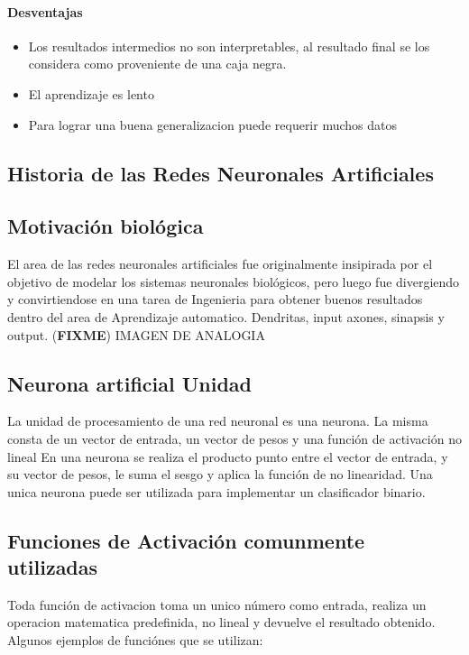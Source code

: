 \documentclass[a4paper,11pt,spanish]{book}
\newcommand*{\FIXME}[1]{{(\textbf{FIXME}) {#1}}}
\begin{document}
	\paragraph {Desventajas}
	  \begin{itemize}
	    \item Los resultados intermedios no son interpretables, al resultado final se los considera como proveniente de una caja negra.
	    \item El aprendizaje es lento
	    \item Para lograr una buena generalizacion puede requerir muchos datos
	  \end{itemize}

      \subsection {Historia de las Redes Neuronales Artificiales}
      
      \subsection {Motivación biológica} 
	El area de las redes neuronales artificiales fue originalmente insipirada por el objetivo de modelar los sistemas neuronales biológicos, 
	pero luego fue divergiendo
	y convirtiendose en una tarea de Ingenieria para obtener buenos resultados dentro del area de Aprendizaje automatico.
	Dendritas, input axones, sinapsis y output.
	\FIXME {IMAGEN DE ANALOGIA}

      \subsection {Neurona artificial Unidad}
	La unidad de procesamiento de una red neuronal es una neurona. La misma consta de un vector de entrada, un vector de pesos y una función de activación no lineal
	En una neurona se realiza el producto punto entre el vector de entrada, y su vector de pesos, le suma el sesgo y aplica la función de no linearidad.
	Una unica neurona puede ser utilizada para implementar un clasificador binario.

      \subsection {Funciones de Activación comunmente utilizadas}
	Toda función de activacion toma un unico número como entrada, realiza un operacion matematica predefinida, no lineal y devuelve el resultado obtenido.
	Algunos ejemplos de funciónes que se utilizan:
\end{document}
